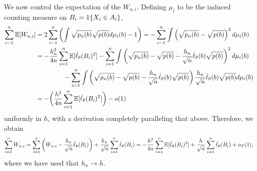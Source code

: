 We now control the expectation of the $W_{n,i}$. Defining $\mu_i$ to be the
induced counting measure on $B_i = 1\!\left\{X_i \in A_i\right\}$,
\begin{align*}
  \sum_{i = 1}^n \mathbb{E}[W_{n,i}]
  & = 2\sum_{i = 1}^n
  \left(\int \sqrt{p_n(b)} \sqrt{p(b)} d\mu_i(b) - 1 \right)
  = -\sum_{i = 1}^n \int \left(\sqrt{p_n(b)} - \sqrt{p(b)}\right)^2
  d\mu_i(b) \\
  & = -\frac{h_n^2}{4 n} \sum_{i = 1}^n \mathbb{E}[\dot{\ell}_\theta(B_i)^2]
  - \sum_{i = 1}^n \int \left(\sqrt{p_n(b)} - \sqrt{p(b)}
  - \frac{h_n}{\sqrt{n}} \dot{\ell}_\theta(b) \sqrt{p(b)}\right)^2 d\mu_i(b) \\
  & \qquad \qquad ~
  - \sum_{i = 1}^n \int \left(\sqrt{p_n(b)} - \sqrt{p(b)}
  - \frac{h_n}{\sqrt{n}} \dot{\ell}_\theta(b) \sqrt{p(b)}\right)
  \frac{h_n}{\sqrt{n}} \dot{\ell}_\theta(b) \sqrt{p(b)}d\mu_i(b) \\
  & = -\bigg(\frac{h^2}{4n} \sum_{i = 1}^n \mathbb{E}[\dot{\ell}_\theta(B_i)^2]\bigg)
  - o(1)
\end{align*}
uniformly in $h$, with a derivation completely paralleling that above.
Therefore, we obtain
\begin{equation*}
  \sum_{i = 1}^n W_{n,i}
  = \sum_{i = 1}^n \left(W_{n,i} - \frac{h_n}{\sqrt{n}} \dot{\ell}_\theta(B_i)\right)
  + \frac{h_n}{\sqrt{n}} \sum_{i = 1}^n \dot{\ell}_\theta(B_i)
  = -\frac{h^2}{4n} \sum_{i = 1}^n \mathbb{E}[\dot{\ell}_\theta(B_i)^2]
  + \frac{h}{\sqrt{n}} \sum_{i = 1}^n \dot{\ell}_\theta(B_i)
  + o_P(1),
\end{equation*}
where we have used that $h_n \to h$.

